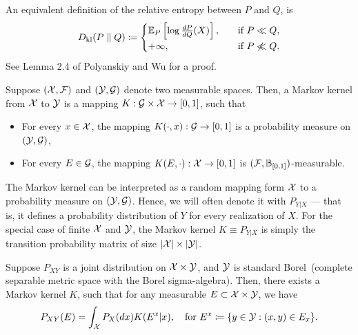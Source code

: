         \begin{fact}
            \label{fact:rel-ent-general-2}
            An equivalent definition of the relative entropy between $P$ and $Q$, is 
            \begin{align}
                D_{\text{kl}}(P \parallel Q) \coloneqq 
                \begin{cases}
                 \mathbb{E}_P \left[ \log \frac{dP}{dQ}(X) \right], & \quad \text{if } P\ll Q, \\
                 + \infty, & \quad \text{if } P \not \ll Q.  
                \end{cases}
            \end{align}
            See Lemma 2.4 of Polyanskiy and Wu for a proof. 
        \end{fact}
        \begin{definition}
            \label{def:markov-kernel} Suppose $(\mathcal{X}, \mathcal{F})$ and $(\mathcal{Y}, \mathcal{G})$ denote two measurable spaces. Then, a Markov kernel from $\mathcal{X}$ to $\mathcal{Y}$ is a mapping $K:\mathcal{G} \times \mathcal{X} \to [0,1]$, such that 
            \begin{itemize}
                \item For every $x \in \mathcal{X}$, the mapping $K(\cdot, x): \mathcal{G} \to [0,1]$ is a probability measure on $(\mathcal{Y}, \mathcal{G})$, 
                \item For every $E \in \mathcal{G}$, the mapping $K(E, \cdot): \mathcal{X} \to [0,1]$ is $(\mathcal{F}, \mathbb{B}_{[0,1]})$-measurable. 
            \end{itemize}
        \end{definition}        

        \begin{remark}
            The Markov kernel can be interpreted as a random mapping form $\mathcal{X}$ to a probability measure on $(\mathcal{Y}, \mathcal{G})$. Hence, we will often denote it with $P_{Y|X}$ --- that is, it defines a probability distribution of $Y$ for every realization of $X$.  For the special case of finite $\mathcal{X}$ and $\mathcal{Y}$,  the Markov kernel $K \equiv P_{Y|X}$ is simply the  transition probability matrix of size $|\mathcal{X}|\times |\mathcal{Y}|$. 
        \end{remark}

        \begin{fact}
            \label{fact:disintegration-theorem}
            Suppose $P_{XY}$ is a joint distribution on $\mathcal{X} \times \mathcal{Y}$, and $\mathcal{Y}$ is standard Borel~(complete separable metric space with the Borel sigma-algebra). Then, there exists a Markov kernel $K$, such that for any measurable $E \subset \mathcal{X} \times \mathcal{Y}$, we have 
            \begin{align}
                P_{XY}(E) = \int_{\mathcal{X}}P_X(dx) K(E^x|x), \quad \text{for } E^x \coloneqq \{y \in \mathcal{Y}: (x,y) \in E_x\}. 
            \end{align}
        \end{fact}

